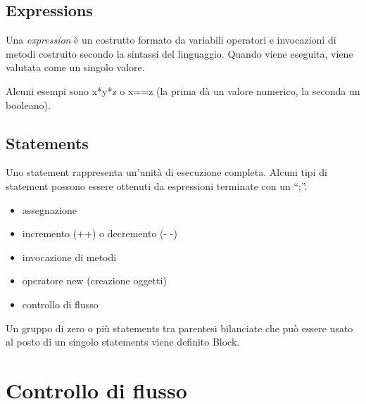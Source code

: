\documentclass[a4paper,12pt,twoside]{book}
\begin{document}
\subsection{Expressions}

Una \emph{expression} è un costrutto formato da variabili operatori e
invocazioni di metodi costruito secondo la sintassi del
linguaggio. Quando viene eseguita, viene valutata come un singolo
valore.

Alcuni esempi sono x*y*z o x==z (la prima dà un valore numerico, la
seconda un booleano).

\subsection{Statements}

Uno statement rappresenta un’unità di esecuzione completa. Alcuni tipi
di statement possono essere ottenuti da espressioni terminate con un
“;”.
\begin{itemize}
\item assegnazione
\item incremento (++) o decremento (- -)
\item invocazione di metodi
\item operatore new (creazione oggetti)
\item controllo di flusso
\end{itemize}

Un gruppo di zero o più statements tra parentesi bilanciate che può
essere usato al posto di un singolo statements viene definito Block.

\section{Controllo di flusso}
\end{document}
